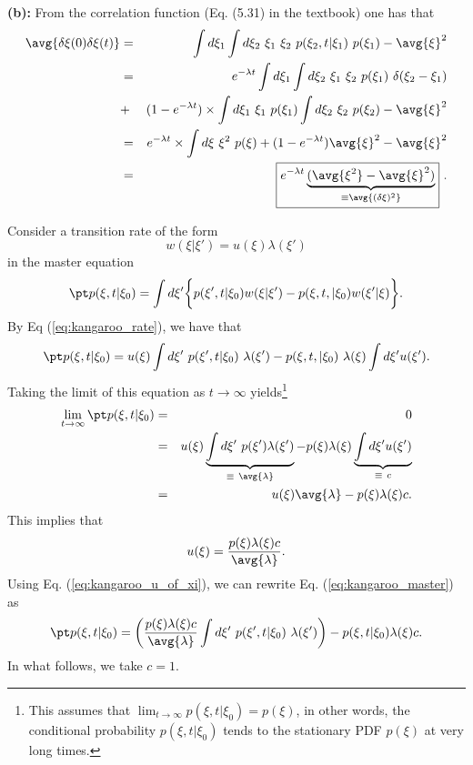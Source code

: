 \textbf{(b):} 
From the correlation function (Eq. (5.31) in the textbook) one has that
\begin{eqnarray}
\avg{\delta \xi(0) \delta \xi(t)} &=& \int d \xi_1\int d\xi_2~\xi_1~\xi_2 ~p(\xi_2, t|\xi_1)~p(\xi_1) - \avg{\xi}^2 \nonumber \\
&=& e^{-\lambda t} \int d \xi_1\int d\xi_2~\xi_1~\xi_2 ~p(\xi_1)~\delta(\xi_2-\xi_1)  \nonumber \\
&+&(1-e^{-\lambda t}) \times \int d \xi_1~\xi_1~p(\xi_1) \int d\xi_2~\xi_2 ~p(\xi_2) - \avg{\xi}^2 \nonumber \\
&=& e^{-\lambda t} \times \int d \xi~\xi^2 ~p(\xi) + (1-e^{-\lambda t}) \avg{\xi}^2 - \avg{\xi}^2 \nonumber \\
&=& \boxed{e^{-\lambda t} \underbrace{(\avg{\xi^2} - \avg{\xi}^2)}_{\equiv \avg{(\delta \xi)^2}}}~. \nonumber \\
\end{eqnarray}




Consider a transition rate of the form 
\begin{equation}
w(\xi|\xi') = u(\xi) \lambda(\xi') \label{eq:kangaroo_rate}
\end{equation} 
in the master equation
\begin{equation}
\pt p(\xi, t | \xi_0) = \int d\xi' \bigg\{ p(\xi', t | \xi_0) w(\xi|\xi') -  p(\xi, t, |\xi_0) w(\xi'|\xi) \bigg\}. \nonumber
\end{equation}
By Eq (\ref{eq:kangaroo_rate}), we have that
\begin{equation}
\pt p(\xi, t | \xi_0) = u(\xi) \int d \xi'~p(\xi', t | \xi_0) ~\lambda(\xi') - p(\xi, t, |\xi_0)~\lambda(\xi) \int d \xi' u(\xi'). \label{eq:kangaroo_master}
\end{equation}
Taking the limit of this equation as $t\rightarrow \infty$ yields\footnote{This assumes that $\lim_{t\rightarrow \infty} p(\xi, t| \xi_0) = p(\xi)$, in other words, the conditional probability $p(\xi, t | \xi_0)$ tends to the stationary PDF $p(\xi)$ at very long times.}
\begin{eqnarray}
\lim_{t\rightarrow \infty} \pt p(\xi, t| \xi_0) &=& 0 \nonumber \\
&=& u(\xi) \underbrace{\int d \xi'~p(\xi') \lambda(\xi')}_{\equiv~\avg{\lambda}} -  p(\xi) \lambda(\xi) \underbrace{\int d \xi' u(\xi')}_{\equiv ~c} \nonumber \\
&=&  u(\xi)\avg{\lambda} -  p(\xi) \lambda(\xi) c. \nonumber
\end{eqnarray}
This implies that
\begin{equation}
u(\xi) = \frac{p(\xi) \lambda(\xi)c}{\avg{\lambda}}. \nonumber \label{eq:kangaroo_u_of_xi}
\end{equation}
Using Eq. (\ref{eq:kangaroo_u_of_xi}), we can rewrite Eq. (\ref{eq:kangaroo_master}) as
\begin{equation}
\pt p(\xi, t | \xi_0) = \bigg( \frac{p(\xi)\lambda(\xi)c}{\avg{\lambda}} \int d \xi'~p(\xi', t | \xi_0)~\lambda(\xi') \bigg) - p(\xi, t | \xi_0) \lambda(\xi) c. \label{eq:kangaroo_simplified_master}
\end{equation}
In what follows, we take $c=1$.

